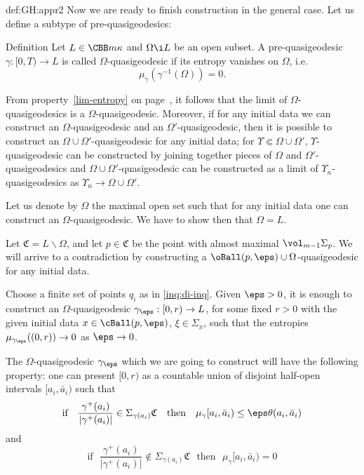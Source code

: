 {\begin{subthm}{def:GH:appr2}
Now we are ready to finish construction in the general case. 
Let us define a subtype
of pre-quasigeodesics:

\begin{thm}{Definition}
Let $L\in \CBB m \kappa$ and $\Omega\i L$ be an open subset. 
A pre-quasigeodesic $\gamma:[0,T)\to L$ is called $\Omega$-quasigeodesic if  its
entropy vanishes on $\Omega$, i.e. 
$$\mu_\gamma(\gamma^{-1}(\Omega))=0.$$

\end{thm}

From property~\ref{lim-entropy} on page~\pageref{lim-entropy}, it follows that
the limit of $\Omega$-quasigeodesics is a $\Omega$-quasigeodesic. 
Moreover, if for any initial data we can construct an
$\Omega$-quasigeodesic and an $\Omega'$-quasigeodesic, then it is possible to construct an
$\Omega\cup \Omega'$-quasigeodesic for any initial data; for $\Upsilon\Subset\Omega\cup \Omega'$, $\Upsilon$-quasigeodesic can be constructed by joining together
pieces of $\Omega$ and $\Omega'$-quasigeodesics and $\Omega\cup \Omega'$-quasigeodesic can be constructed as a limit of $\Upsilon_n$-quasigeodesics as $\Upsilon_n\to \Omega\cup \Omega'$.

Let us denote by $\Omega$ the maximal open set such that for any initial data
one can construct an $\Omega$-quasigeodesic. 
We have to show then that $\Omega=L$. 























Let $\mathfrak C=L\backslash \Omega$, and let $p\in \mathfrak C$ be the point
with almost maximal $\vol_{m-1} \Sigma_p$. 
We will arrive to a contradiction by constructing  a $\oBall(p,\eps)\cup\Omega$-quasigeodesic for any initial data. 

Choose a finite set of points $q_i$ as in \ref{inq:di-inq}.
Given $\eps>0$, it is enough to construct an $\Omega$-quasigeodesic
$\gamma_\eps:[0,r)\to L$, for some fixed $r>0$ with the given initial data $x\in
\cBall(p,\eps)$, $\xi\in \Sigma_x$, such that the entropies
$\mu_{\gamma_\eps}((0,r))\to 0$ as $\eps\to0$.
 
The $\Omega$-quasigeodesic $\gamma_\eps$ which we are going to construct will
have the following property: one can present $[0,r)$ as a countable union of disjoint
half-open intervals $[a_i,\bar a_i)$ such that 
$$\text{if}\ \ \
\frac{\gamma^+(a_i)}{|\gamma^+(a_i)|}\in \Sigma_{\gamma(a_i)}\mathfrak C \ \ \
\text{then}\ \ \   \mu_\gamma[a_i,\bar a_i)\le \eps\theta(a_i,\bar a_i)$$ 
and
$$\text{if}\ \ \ \frac{\gamma^+(a_i)}{|\gamma^+(a_i)|}\not\in
\Sigma_{\gamma(a_i)}\mathfrak C\ \ \ \text{then}\ \ \ \mu_\gamma[a_i,\bar a_i)=0$$


\end{subthm}}
